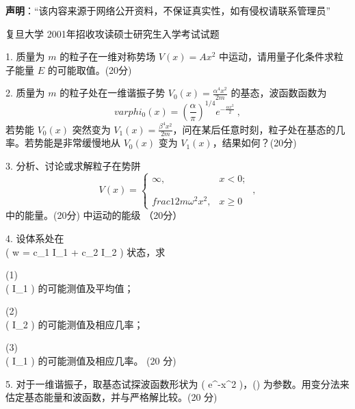 

\begin{issues}
\issueTODO
\end{issues}

\textbf{声明}：“该内容来源于网络公开资料，不保证真实性，如有侵权请联系管理员”

复旦大学 2001年招收攻读硕士研究生入学考试试题

1. 质量为 $m$ 的粒子在一维对称势场 $V(x) = Ax^2$ 中运动，请用量子化条件求粒子能量 $E$ 的可能取值。(20分)

2. 质量为 $m$ 的粒子处在一维谐振子势 $V_0(x) = \frac{\alpha^4 x^2}{2m}$ 的基态，波函数函数为
$$ varphi_0(x) = \left(\frac{\alpha}{\pi}\right)^{1/4} e^{-\frac{\alpha x^2}{2}}~,$$ 
若势能 $V_0(x)$ 突然变为 $V_1(x) = \frac{\beta^4 x^2}{2m}$，问在某后任意时刻，粒子处在基态的几率。若势能是非常缓慢地从 $V_0(x)$ 变为 $V_1(x)$，结果如何？(20分)

3. 分析、讨论或求解粒子在势阱
$$  V(x) = \begin{cases} \infty, & x < 0; \\\\ \\frac{1}{2} m \omega^2 x^2, & x \geq 0 \end{cases}~,$$ 
中的能量。(20分)
中运动的能级 （20分）

4. 设体系处在 \\( w = c_1 I_1 + c_2 I_2 ) 状态，求

(1) \\( I_1 ) 的可能测值及平均值；

(2) \\( I_2 ) 的可能测值及相应几率；

(3) \\( I_1 ) 的可能测值及相应几率。 (20 分)

5. 对于一维谐振子，取基态试探波函数形状为 ( e^{-\lambda x^2} )，(\lambda) 为参数。用变分法来
    估定基态能量和波函数，并与严格解比较。(20 分)
